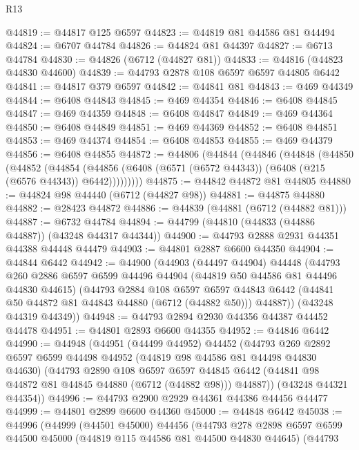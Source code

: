 \begin{lexlean}{R13}
\begin{coremodule}
@44819 := @44817 @125 @6597
@44823 := @44819 @81 @44586 @81 @44494
@44824 := @6707 @44784
@44826 := @44824 @81 @44397
@44827 := @6713 @44784
@44830 := @44826 (@6712 (@44827 @81))
@44833 := @44816 (@44823 @44830 @44600)
@44839 := @44793 @2878 @108 @6597 @6597 @44805 @6442
@44841 := @44817 @379 @6597
@44842 := @44841 @81
@44843 := @469 @44349
@44844 := @6408 @44843
@44845 := @469 @44354
@44846 := @6408 @44845
@44847 := @469 @44359
@44848 := @6408 @44847
@44849 := @469 @44364
@44850 := @6408 @44849
@44851 := @469 @44369
@44852 := @6408 @44851
@44853 := @469 @44374
@44854 := @6408 @44853
@44855 := @469 @44379
@44856 := @6408 @44855
@44872 := @44806
    (@44844
      (@44846
        (@44848
          (@44850
            (@44852
              (@44854
                (@44856 (@6408 (@6571 (@6572 @44343)) (@6408 (@215 (@6576 @44343)) @6442)))))))))
@44875 := @44842 @44872 @81 @44805
@44880 := @44824 @98 @44440 (@6712 (@44827 @98))
@44881 := @44875 @44880
@44882 := @28423 @44872
@44886 := @44839 (@44881 (@6712 (@44882 @81)))
@44887 := @6732 @44784
@44894 := @44799 (@44810 (@44833 (@44886 @44887)) (@43248 @44317 @44344))
@44900 := @44793 @2888 @2931 @44351 @44388 @44448 @44479
@44903 := @44801 @2887 @6600 @44350
@44904 := @44844 @6442
@44942 := @44900
    (@44903
      (@44497 @44904)
      @44448
      (@44793
        @260
        @2886
        @6597
        @6599
        @44496
        @44904
        (@44819 @50 @44586 @81 @44496 @44830 @44615)
        (@44793
          @2884
          @108
          @6597
          @6597
          @44843
          @6442
          (@44841 @50 @44872 @81 @44843 @44880 (@6712 (@44882 @50)))
          @44887))
      (@43248 @44319 @44349))
@44948 := @44793 @2894 @2930 @44356 @44387 @44452 @44478
@44951 := @44801 @2893 @6600 @44355
@44952 := @44846 @6442
@44990 := @44948
    (@44951
      (@44499 @44952)
      @44452
      (@44793
        @269
        @2892
        @6597
        @6599
        @44498
        @44952
        (@44819 @98 @44586 @81 @44498 @44830 @44630)
        (@44793
          @2890
          @108
          @6597
          @6597
          @44845
          @6442
          (@44841 @98 @44872 @81 @44845 @44880 (@6712 (@44882 @98)))
          @44887))
      (@43248 @44321 @44354))
@44996 := @44793 @2900 @2929 @44361 @44386 @44456 @44477
@44999 := @44801 @2899 @6600 @44360
@45000 := @44848 @6442
@45038 := @44996
    (@44999
      (@44501 @45000)
      @44456
      (@44793
        @278
        @2898
        @6597
        @6599
        @44500
        @45000
        (@44819 @115 @44586 @81 @44500 @44830 @44645)
        (@44793

\end{coremodule}
\end{lexlean}
